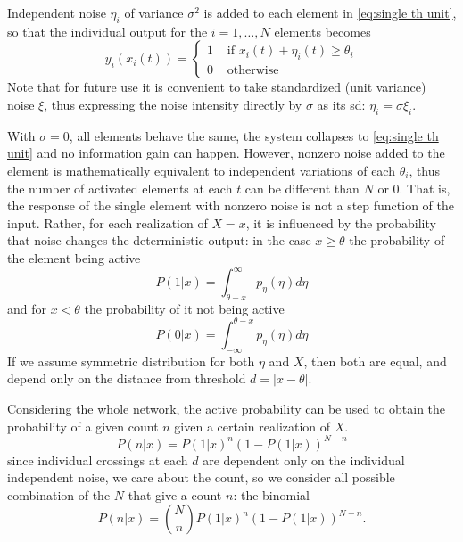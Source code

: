 Independent noise $\eta_i$ of variance $\sigma^2$ is added to each element in \ref{eq:single th unit}, so that the individual output for the $i=1,\dots,N$ elements becomes
\begin{equation}
    y_i(x_i(t)) = 
    \begin{cases}
        1 &\text{ if } x_i(t) + \eta_i(t) \geq \theta_i\\
        0 &\text{ otherwise}
    \end{cases}
\end{equation}
Note that for future use it is convenient to take standardized (unit variance) noise $\xi$, thus expressing the noise intensity directly by $\sigma$ as its sd: $\eta_i = \sigma\xi_i$.

With $\sigma =0$, all elements behave the same, the system collapses to \ref{eq:single th unit} and no information gain can happen.
However, nonzero noise added to the element is mathematically equivalent to independent variations of each $\theta_i$, thus the number of activated elements at each $t$ can be different than $N$ or 0. 
That is, the response of the single element with nonzero noise is not a step function of the input. 
Rather, for each realization of $X=x$, it is influenced by the probability that noise changes the deterministic output: in the case $x\geq\theta$ the probability of the element being active
\begin{equation}
    \label{eq:p active}
    P(1|x) = \int_{\theta - x}^{\infty} p_{\eta}(\eta)d\eta
\end{equation}
and for $x<\theta$ the probability of it not being active
\begin{equation}
    \label{eq:p not active}
    P(0|x) = \int_{-\infty}^{\theta - x} p_\eta(\eta)d\eta
\end{equation}
If we assume symmetric distribution for both $\eta$ and $X$, then both are equal, and depend only on the distance from threshold $ d= |x-\theta|$. 

Considering the whole network, the active probability can be used to obtain the probability of a given count $n$ given a certain realization of $X$.
\begin{equation}
    P(n|x) = P(1|x)^n(1-P(1|x))^{N-n}
\end{equation}
since individual crossings at each $d$ are dependent only on the individual independent noise, we care about the count, so we consider all possible combination of the $N$ that give a count $n$: the binomial
\begin{equation}
    P(n|x) = \binom{N}{n}P(1|x)^n(1-P(1|x))^{N-n} \text{.}
\end{equation}

